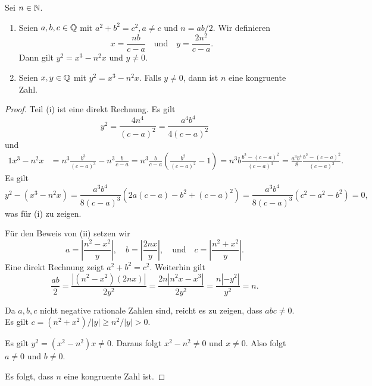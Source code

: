 \begin{lemma} \label{lem:congruentelliptic}
  Sei $n\in{\mathbb{N}}$. 
  \begin{enumerate}
  \item
  Seien $a,b,c\in {\mathbb{Q}}$ mit $a^2+b^2=c^2,a\not=c$ und $n = ab/2$. Wir definieren
  \begin{equation*}
    x = \frac{nb}{c-a} \quad\text{und}\quad
    y = \frac{2n^2}{c-a}. 
  \end{equation*}
  Dann gilt $y^2 = x^3-n^2 x$ und $y\not=0$.
  \item Seien $x,y\in{\mathbb{Q}}$ mit $y^2 = x^3-n^2x$. Falls $y\not=0$, dann
    ist $n$ eine kongruente Zahl.
  \end{enumerate}
\end{lemma}
\begin{proof}
  Teil (i) ist eine direkt Rechnung. Es gilt
  \begin{equation*}
    y^2 = \frac{4n^4}{(c-a)^2} = \frac{a^4b^4}{4(c-a)^2} 
  \end{equation*}
  und
  \begin{alignat*}1
    x^3 -n^2 x &= n^3 \frac{b^3}{(c-a)^3} - n^3 \frac{b}{c-a}
    = n^3 \frac{b}{c-a}\left(\frac{b^2}{(c-a)^2}-1\right)
    = n^3 b\frac{b^2-(c-a)^2}{(c-a)^3}
    = \frac{a^3b^4}{8}\frac{b^2-(c-a)^2}{(c-a)^3}.
  \end{alignat*}
  Es gilt  $$
  y^2 - (x^3-n^2x) = \frac{a^3b^4}{8(c-a)^3} \left(
    2a(c-a) - b^2+(c-a)^2\right) =
  \frac{a^3b^4}{8(c-a)^3} (c^2-a^2-b^2)=0,
  $$
  was für (i)  zu zeigen.

  Für den Beweis von (ii) setzen wir
  \begin{equation*}
    a = \left|\frac{n^2-x^2}{y}\right|, \quad
    b = \left|\frac{2nx}{y}\right|, \quad\text{und}\quad
    c = \left|\frac{n^2+x^2}{y}\right|. 
  \end{equation*}
  Eine direkt Rechnung zeigt $a^2+b^2=c^2$. Weiterhin gilt
  \begin{equation*}
    \frac{ab}{2} = \frac{|(n^2-x^2)(2nx)|}{2y^2} = \frac{2n |n^2x -
      x^3|}{2y^2} = \frac{n |-y^2|}{y^2} = n.
  \end{equation*}

  Da $a,b,c$ nicht negative rationale Zahlen sind, reicht es zu
  zeigen, dass $abc\not=0$. Es gilt $c = (n^2+x^2)/|y| \ge n^2/|y|>0$.

  Es gilt $y^2 = (x^2-n^2)x\not=0$. Daraus folgt 
  $x^2-n^2\not=0$ und $x\not=0$. Also folgt $a\not=0$ und $b\not=0$. 

  Es folgt, dass $n$ eine kongruente Zahl ist. 
\end{proof}


